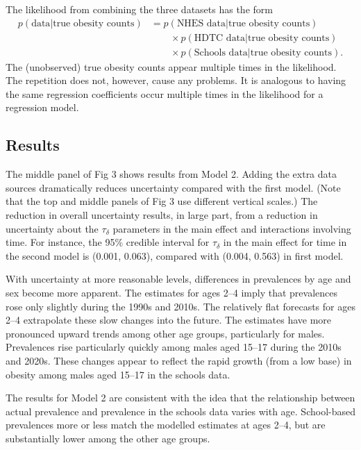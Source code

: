 \documentclass[10pt,letterpaper]{article}
\begin{document}
The likelihood from combining the three datasets has the form
\begin{equation*}
  \begin{split}
  p(\text{data} | \text{true obesity counts}) & = p(\text{NHES data} | \text{true obesity counts}) \\
      & \quad \quad \times p(\text{HDTC data} | \text{true obesity counts}) \\
      & \quad \quad \times p(\text{Schools data} | \text{true obesity counts}).
   \end{split}
\end{equation*} The (unobserved) true obesity counts appear multiple
times in the likelihood. The repetition does not, however, cause any
problems. It is analogous to having the same regression coefficients
occur multiple times in the likelihood for a regression model.

\hypertarget{results-1}{%
\subsection{Results}\label{results-1}}

The middle panel of Fig 3 shows results from Model 2. Adding the extra
data sources dramatically reduces uncertainty compared with the first
model. (Note that the top and middle panels of Fig 3 use different
vertical scales.) The reduction in overall uncertainty results, in large
part, from a reduction in uncertainty about the \(\tau_{\delta}\)
parameters in the main effect and interactions involving time. For
instance, the 95\% credible interval for \(\tau_{\delta}\) in the main
effect for time in the second model is (0.001, 0.063), compared with
(0.004, 0.563) in first model.

With uncertainty at more reasonable levels, differences in prevalences
by age and sex become more apparent. The estimates for ages 2--4 imply
that prevalences rose only slightly during the 1990s and 2010s. The
relatively flat forecasts for ages 2--4 extrapolate these slow changes
into the future. The estimates have more pronounced upward trends among
other age groups, particularly for males. Prevalences rise particularly
quickly among males aged 15--17 during the 2010s and 2020s. These
changes appear to reflect the rapid growth (from a low base) in obesity
among males aged 15--17 in the schools data.

The results for Model 2 are consistent with the idea that the
relationship between actual prevalence and prevalence in the schools
data varies with age. School-based prevalences more or less match the
modelled estimates at ages 2--4, but are substantially lower among the
other age groups.
\end{document}
